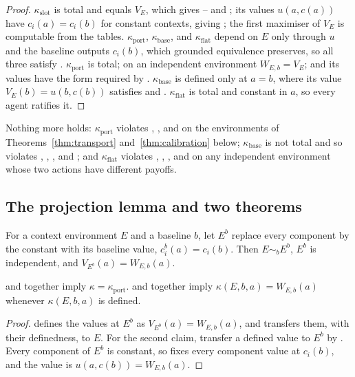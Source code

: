 \begin{proof}
$\kappa_{\mathrm{slot}}$ is total and equals $V_E$, which gives -- and ; its
values $u(a,c(a))$ have $c_i(a)=c_i(b)$ for constant contexts, giving ; the first maximiser of
$V_E$ is computable from the tables. $\kappa_{\mathrm{port}}$, $\kappa_{\mathrm{base}}$, and
$\kappa_{\mathrm{flat}}$ depend on $E$ only through $u$ and the baseline outputs $c_i(b)$, which grounded
equivalence preserves, so all three satisfy . $\kappa_{\mathrm{port}}$ is total; on an
independent environment $W_{E,b}=V_E$; and its values have the form required by .
$\kappa_{\mathrm{base}}$ is defined only at $a=b$, where its value $V_E(b)=u(b,c(b))$ satisfies 
and . $\kappa_{\mathrm{flat}}$ is total and constant in $a$, so every agent ratifies it.
\end{proof}

Nothing more holds: $\kappa_{\mathrm{port}}$ violates , , and  on the
environments of Theorems~\ref{thm:transport} and~\ref{thm:calibration} below; $\kappa_{\mathrm{base}}$ is
not total and so violates , , , and ; and $\kappa_{\mathrm{flat}}$
violates , , , and  on any independent environment whose two
actions have different payoffs.

\subsection{The projection lemma and two theorems}

For a context environment $E$ and a baseline $b$, let $E^b$ replace every component by the constant
with its baseline value, $c^b_i(a)=c_i(b)$. Then $E\sim_bE^b$, $E^b$ is independent, and
$V_{E^b}(a)=W_{E,b}(a)$.

\begin{lemma}[Projection]\label{lem:projection}
 and  together imply $\kappa=\kappa_{\mathrm{port}}$.  and  together
imply $\kappa(E,b,a)=W_{E,b}(a)$ whenever $\kappa(E,b,a)$ is defined.
\end{lemma}

\begin{proof}
 defines the values at $E^b$ as $V_{E^b}(a)=W_{E,b}(a)$, and  transfers them, with
their definedness, to $E$. For the second claim, transfer a defined value to $E^b$ by . Every
component of $E^b$ is constant, so  fixes every component value at $c_i(b)$, and the value is
$u(a,c(b))=W_{E,b}(a)$.
\end{proof}

